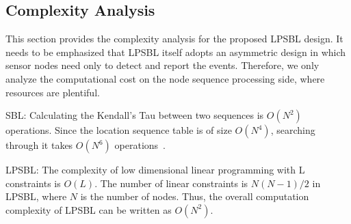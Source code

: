  
\subsection{Complexity Analysis}
This section provides the complexity analysis for the proposed
LPSBL design. It needs to be emphasized that
LPSBL itself adopts an asymmetric design in which sensor
nodes need only to detect and report the events. Therefore,
we only analyze the computational cost on the node sequence
processing side, where resources are plentiful.

SBL: Calculating the Kendall’s Tau
between two sequences is $O(N^2)$ operations. Since the location sequence table is of size
$O(N^4)$, searching through it takes $O(N^6)$ operations~\cite{yedavalli2008sequence}.

LPSBL: The complexity of low dimensional linear programming
with L constraints is $O(L)$\cite{Griva2009}. The number of linear constraints is $N(N-1)/2$ in LPSBL,
where $N$ is the number of nodes. Thus, the overall computation
complexity of LPSBL can be written as $O(N^2)$.




